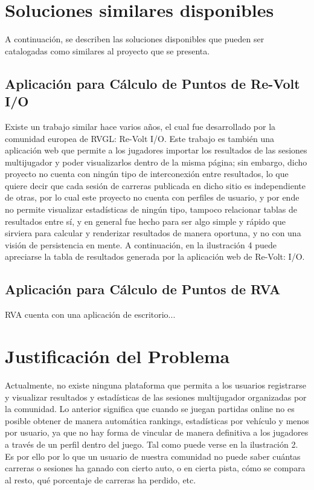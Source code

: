 \section{Soluciones similares disponibles}
A continuación, se describen las soluciones disponibles que pueden ser catalogadas como similares al proyecto que se presenta.

\subsection{Aplicación para Cálculo de Puntos de Re-Volt I/O}
Existe un trabajo similar hace varios años, el cual fue desarrollado por la comunidad europea de RVGL: Re-Volt I/O. Este trabajo es también una aplicación web que permite a los jugadores importar los resultados de las sesiones multijugador y poder visualizarlos dentro de la misma página; sin embargo, dicho proyecto no cuenta con ningún tipo de interconexión entre resultados, lo que quiere decir que cada sesión de carreras publicada en dicho sitio es independiente de otras, por lo cual este proyecto no cuenta con perfiles de usuario, y por ende no permite visualizar estadísticas de ningún tipo, tampoco relacionar tablas de resultados entre sí, y en general fue hecho para ser algo simple y rápido que sirviera para calcular y renderizar resultados de manera oportuna, y no con una visión de persistencia en mente. A continuación, en la ilustración 4 puede apreciarse la tabla de resultados generada por la aplicación web de Re-Volt: I/O.

\subsection{Aplicación para Cálculo de Puntos de RVA}
RVA cuenta con una aplicación de escritorio...

\section{Justificación del Problema}
Actualmente, no existe ninguna plataforma que permita a los usuarios registrarse y visualizar resultados y estadísticas de las sesiones multijugador organizadas por la comunidad. Lo anterior significa que cuando se juegan partidas online no es posible obtener de manera automática rankings, estadísticas por vehículo y menos por usuario, ya que no hay forma de vincular de manera definitiva a los jugadores a través de un perfil dentro del juego. Tal como puede verse en la ilustración 2. Es por ello por lo que un usuario de nuestra comunidad no puede saber cuántas carreras o sesiones ha ganado con cierto auto, o en cierta pista, cómo se compara al resto, qué porcentaje de carreras ha perdido, etc.



